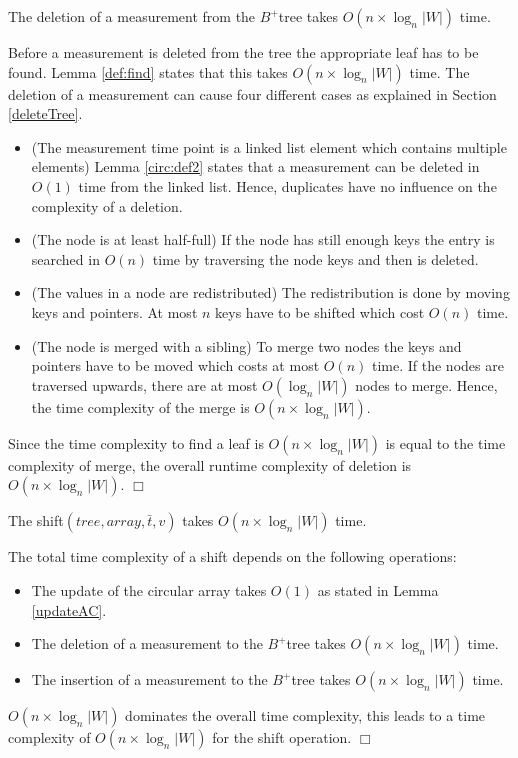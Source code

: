 \documentclass[abstracton,12pt,oneside]{scrreprt}
\newenvironment{proof}
  {\noindent{\bf Proof:\rm}}{\hfill$\Box$\vspace{\medskipamount}}
\begin{document}
\begin{mydef}
	The deletion of a measurement from the $B^+$tree takes $O(n \times \log_{n}|W|)$ time.
\end{mydef}
\begin{proof}
	Before a measurement is deleted from the tree the appropriate leaf has to be found. Lemma \ref{def:find} states that this takes $O(n \times \log_{n}|W|)$ time.
	The deletion of a measurement can cause four different cases as explained in Section \ref{deleteTree}. 
	\begin{itemize}
		\item (The measurement time point is a linked list element which contains multiple elements) Lemma \ref{circ:def2} states that a measurement can be deleted in $O(1)$ time from the linked list. Hence, duplicates have no influence on the complexity of a deletion. 
		\item (The node is at least half-full) If the node has still enough keys the entry is searched in $O(n)$ time by traversing the node keys and then is deleted. 
		\item (The values in a node are redistributed) The redistribution is done by moving keys and pointers. At most $n$ keys have to be shifted which cost $O(n)$ time.
		\item (The node is merged with a sibling) To merge two nodes the keys and pointers have to be moved which costs at most $O(n)$ time. If the nodes are traversed upwards, there are at most $O(\log_{n}|W|)$ nodes to merge. Hence, the time complexity of the merge is $O(n \times \log_{n}|W|)$.
	\end{itemize}
	Since the time complexity to find a leaf is $O(n \times \log_{n}|W|)$ is equal to the time complexity of merge, the overall runtime complexity of deletion is $O(n \times \log_{n}|W|)$.
\end{proof}



\begin{mydef}
	The shift$(tree, array, \bar{t}, v)$ takes $O(n \times \log_{n}|W|)$ time.
	\label{shiftC}
\end{mydef}
\begin{proof}
The total time complexity of a shift depends on the following operations:
	\begin{itemize}
		\item The update of the circular array takes $O(1)$ as stated in Lemma \ref{updateAC}.
		\item The deletion of a measurement to the $B^+$tree takes $O(n \times \log_{n}|W|)$ time.
		\item The insertion of a measurement to the $B^+$tree takes $O(n \times \log_{n}|W|)$ time.
	\end{itemize}
	$O(n \times \log_{n}|W|)$ dominates the overall time complexity, this leads to a time complexity of $O(n \times \log_{n}|W|)$ for the shift operation. 
\end{proof}
\end{document}
